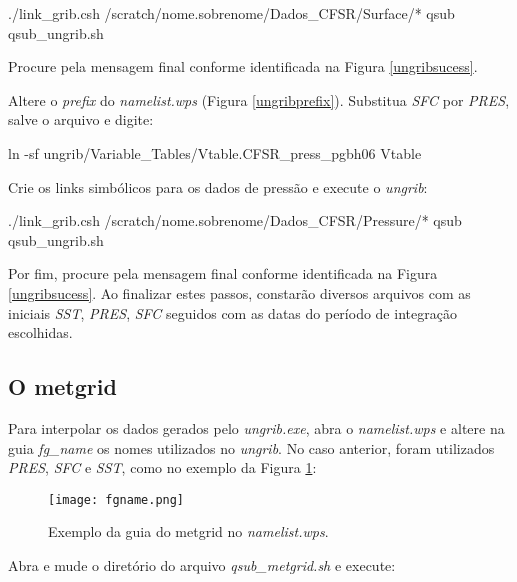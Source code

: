 \begin{bashcode}
./link_grib.csh /scratch/nome.sobrenome/Dados_CFSR/Surface/*
qsub qsub_ungrib.sh
\end{bashcode}
\bigskip

\noindent Procure pela mensagem final conforme identificada na Figura \textcolor{bleu_cite}{\ref{ungribsucess}}.
\bigskip

\noindent Altere o \textit{prefix} do \textit{namelist.wps} (Figura \textcolor{bleu_cite}{\ref{ungribprefix}}). Substitua \textit{SFC} por \textit{PRES}, salve o arquivo e digite:
\bigskip

\begin{bashcode}
 ln -sf ungrib/Variable_Tables/Vtable.CFSR_press_pgbh06 Vtable
\end{bashcode}
\bigskip

\noindent Crie os links simbólicos para os dados de pressão e execute o \textit{ungrib}:
\bigskip

\begin{bashcode}
./link_grib.csh /scratch/nome.sobrenome/Dados_CFSR/Pressure/*
qsub qsub_ungrib.sh
\end{bashcode}
\bigskip

\noindent Por fim, procure pela mensagem final conforme identificada na Figura \textcolor{bleu_cite}{\ref{ungribsucess}}. Ao finalizar estes passos, constarão diversos arquivos com as iniciais \textit{SST}, \textit{PRES}, \textit{SFC} seguidos com as datas do período de integração escolhidas.
\bigskip




\subsection{O metgrid}
\bigskip
\noindent Para interpolar os dados gerados pelo \textit{ungrib.exe},  abra o \textit{namelist.wps} e altere na guia \textit{fg\_name} os nomes utilizados no \textit{ungrib}. No caso anterior, foram utilizados \textit{PRES}, \textit{SFC} e \textit{SST}, como no exemplo da Figura \textcolor{bleu_cite}{\ref{fgname}}:
\bigskip

\begin{figure}[H]
    \centering
    \texttt{[image: fgname.png]}
    \caption{Exemplo da guia do metgrid no \textit{namelist.wps}.}
    \label{fgname}
\end{figure}
\bigskip

\noindent Abra e mude o diretório do arquivo \textit{qsub\_metgrid.sh} e execute:
\bigskip

